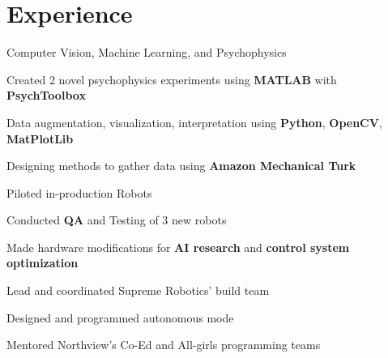 \documentclass[]{chandan-cv}
\begin{document}
\begin{minipage}[t]{0.66\textwidth} 


\section{Experience}
\vspace{\topsep} %
\begin{tightemize}
	\item Computer Vision, Machine Learning, and Psychophysics
	\item Created 2 novel psychophysics experiments using \textbf{MATLAB} with \textbf{PsychToolbox}
	\item Data augmentation, visualization, interpretation using \textbf{Python}, \textbf{OpenCV}, \textbf{MatPlotLib}
	\item Designing methods to gather data using \textbf{Amazon Mechanical Turk}
\end{tightemize}
\sectionsep

\begin{tightemize}
	\item Piloted in-production Robots
	\item Conducted \textbf{QA} and Testing of 3 new robots
	\item Made hardware modifications for \textbf{AI research} and \textbf{control system optimization}
\end{tightemize}
\sectionsep

\begin{tightemize}
	\item Lead and coordinated Supreme Robotics' build team
	\item Designed and programmed autonomous mode
\end{tightemize}
\sectionsep

\begin{tightemize}
	\item Mentored Northview's Co-Ed and All-girls programming teams
\end{tightemize}
\sectionsep


\end{minipage}
\end{document}
